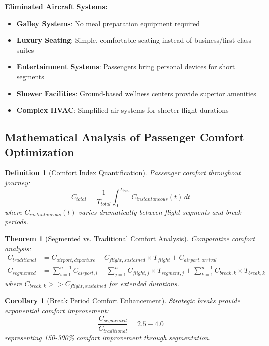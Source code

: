 \documentclass[12pt,a4paper]{article}
\newtheorem{theorem}{Theorem}
\newtheorem{definition}{Definition}
\newtheorem{corollary}{Corollary}
\begin{document}
\textbf{Eliminated Aircraft Systems:}
\begin{itemize}
\item \textbf{Galley Systems}: No meal preparation equipment required
\item \textbf{Luxury Seating}: Simple, comfortable seating instead of business/first class suites
\item \textbf{Entertainment Systems}: Passengers bring personal devices for short segments
\item \textbf{Shower Facilities}: Ground-based wellness centers provide superior amenities
\item \textbf{Complex HVAC}: Simplified air systems for shorter flight durations
\end{itemize}

\subsection{Mathematical Analysis of Passenger Comfort Optimization}

\begin{definition}[Comfort Index Quantification]
Passenger comfort throughout journey:
\begin{equation}
C_{total} = \frac{1}{T_{total}} \int_0^{T_{total}} C_{instantaneous}(t) \, dt
\end{equation}
where $C_{instantaneous}(t)$ varies dramatically between flight segments and break periods.
\end{definition}

\begin{theorem}[Segmented vs. Traditional Comfort Analysis]
Comparative comfort analysis:
\begin{align}
C_{traditional} &= C_{airport,departure} + C_{flight,sustained} \times T_{flight} + C_{airport,arrival} \\
C_{segmented} &= \sum_{i=1}^{n+1} C_{airport,i} + \sum_{j=1}^n C_{flight,j} \times T_{segment,j} + \sum_{k=1}^{n-1} C_{break,k} \times T_{break,k}
\end{align}
where $C_{break,k} >> C_{flight,sustained}$ for extended durations.
\end{theorem}

\begin{corollary}[Break Period Comfort Enhancement]
Strategic breaks provide exponential comfort improvement:
\begin{equation}
\frac{C_{segmented}}{C_{traditional}} = 2.5 - 4.0
\end{equation}
representing 150-300\% comfort improvement through segmentation.
\end{corollary}
\end{document}
